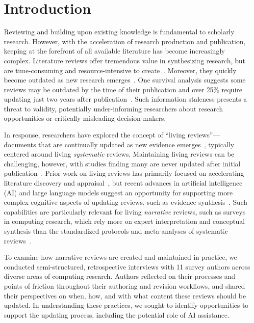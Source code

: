 \section{Introduction}
Reviewing and building upon existing knowledge is fundamental to scholarly research. However, with the acceleration of research production and publication, keeping at the forefront of all available literature has become increasingly complex. Literature reviews offer tremendous value in synthesizing research, but are time-consuming and resource-intensive to create~\cite{tricco2008following, michelson2019significant}. Moreover, they quickly become outdated as new research emerges~\cite{Shekelle2001ValidityOT}. One survival analysis suggests some reviews may be outdated by the time of their publication and over 25\% require updating just two years after publication~\cite{shojania2007quickly}. Such information staleness presents a threat to validity, potentially under-informing researchers about research opportunities or critically misleading decision-makers.

In response, researchers have explored the concept of ``living reviews''---documents that are continually updated as new evidence emerges~\cite{elliott2014living, wijkstra2021livinglitreviews, cochrane2019handbook}, typically centered around living \textit{systematic} reviews. Maintaining living reviews can be challenging, however, with studies finding many are never updated after initial publication~\cite{tricco2008following, heron2023update}. Prior work on living reviews has primarily focused on accelerating literature discovery and appraisal~\cite{thomas2017living, vergara2020living}, but recent advances in artificial intelligence (AI) and large language models suggest an opportunity for supporting more complex cognitive aspects of updating reviews, such as evidence synthesis~\cite{martinboyle2024shallow, wang2024autosurvey}. Such capabilities are particularly relevant for living \textit{narrative} reviews, such as surveys in computing research, which rely more on expert interpretation and conceptual synthesis than the standardized protocols and meta-analyses of systematic reviews~\cite{snyder2019literature}.

To examine how narrative reviews are created and maintained in practice, we conducted semi-structured, retrospective interviews with 11 survey authors across diverse areas of computing research. Authors reflected on their processes and points of friction throughout their authoring and revision workflows, and shared their perspectives on when, how, and with what content these reviews should be updated. In understanding these practices, we sought to identify opportunities to support the updating process, including the potential role of AI assistance.

